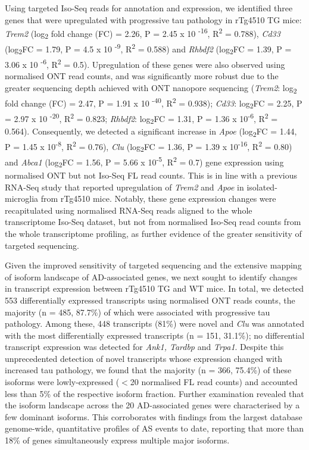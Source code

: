 Using targeted Iso-Seq reads for annotation and expression, we identified three genes that were upregulated with progressive tau pathology in rTg4510 TG mice: \textit{Trem2} (log\textsubscript{2} fold change (FC) = 2.26, P = 2.45 x 10 \textsuperscript{-16}, R\textsuperscript{2} = 0.788), \textit{Cd33} (log\textsubscript{2}FC = 1.79, P = 4.5 x 10 \textsuperscript{-9}, R\textsuperscript{2} = 0.588) and \textit{Rhbdf2} (log\textsubscript{2}FC = 1.39, P = 3.06 x 10 \textsuperscript{-6}, R\textsuperscript{2} = 0.5). Upregulation of these genes were also observed using normalised ONT read counts, and was significantly more robust due to the greater sequencing depth achieved with ONT nanopore sequencing (\textit{Trem2}: log\textsubscript{2} fold change (FC) = 2.47, P = 1.91 x 10 \textsuperscript{-40}, R\textsuperscript{2} = 0.938); \textit{Cd33}: log\textsubscript{2}FC = 2.25, P = 2.97 x 10 \textsuperscript{-20}, R\textsuperscript{2} = 0.823; \textit{Rhbdf2}: log\textsubscript{2}FC = 1.31, P = 1.36 x 10\textsuperscript{-6}, R\textsuperscript{2} = 0.564). Consequently, we detected a significant increase in \textit{Apoe} (log\textsubscript{2}FC = 1.44, P = 1.45 x 10\textsuperscript{-8},  R\textsuperscript{2} = 0.76), \textit{Clu} (log\textsubscript{2}FC = 1.36, P = 1.39 x 10\textsuperscript{-16}, R\textsuperscript{2} = 0.80) and \textit{Abca1} (log\textsubscript{2}FC = 1.56, P = 5.66 x 10\textsuperscript{-5}, R\textsuperscript{2} = 0.7) gene expression using normalised ONT but not Iso-Seq FL read counts. This is in line with a previous RNA-Seq study that reported upregulation of \textit{Trem2} and \textit{Apoe} in isolated-microglia from rTg4510 mice\cite{Sobue2021}. Notably, these gene expression changes were recapitulated using normalised RNA-Seq reads aligned to the whole transcriptome Iso-Seq dataset, but not from normalised Iso-Seq read counts from the whole transcriptome profiling, as further evidence of the greater sensitivity of targeted sequencing. 

Given the improved sensitivity of targeted sequencing and the extensive mapping of isoform landscape of AD-associated genes, we next sought to identify changes in transcript expression between rTg4510 TG and WT mice. In total, we detected 553 differentially expressed transcripts using normalised ONT reads counts, the majority (n = 485, 87.7\%) of which were associated with progressive tau pathology. Among these, 448 transcripts (81\%) were novel and \textit{Clu} was annotated with the most differentially expressed transcripts (n = 151, 31.1\%); no differential transcript expression was detected for \textit{Ank1, Tardbp} and \textit{Trpa1}. Despite this unprecedented detection of novel transcripts whose expression changed with increased tau pathology, we found that the majority (n = 366, 75.4\%) of these isoforms were lowly-expressed ($<$20 normalised FL read counts) and accounted less than 5\% of the respective isoform fraction. Further examination revealed that the isoform landscape across the 20 AD-associated genes were characterised by a few dominant isoforms. This corroborates with findings from the largest database genome-wide, quantitative profiles of AS events to date, reporting that more than 18\% of genes simultaneously express multiple major isoforms\cite{Tapial2017}. 

